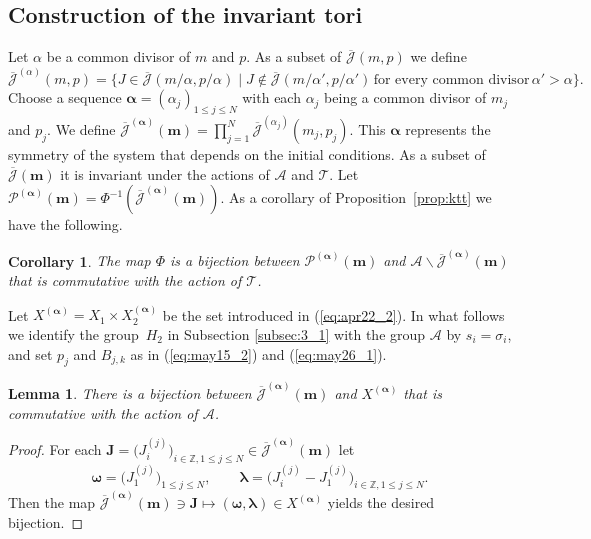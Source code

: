 \documentclass[11pt]{article}
\newtheorem{lemma}{Lemma}
\newtheorem{corollary}{Corollary}
\newcommand{\Z}{{\mathbb Z}}
\newcommand{\J}{{\mathcal J}}
\newcommand{\Jb}{{\overline{\mathcal J}}}
\newcommand\bom{\boldsymbol{\omega}}
\newcommand\bol{\boldsymbol{\lambda}}
\newcommand\boa{\boldsymbol{\alpha}}
\newcommand{\m}{{\boldsymbol m}}
\newcommand{\boJ}{{\boldsymbol J}}
\begin{document}
\subsection{Construction of the invariant tori}\label{subsec:4_4}
Let $\alpha$ be a common divisor of $m$ and $p$.
As a subset of $\Jb (m,p)$ %
we def\/ine
\begin{displaymath}
{\Jb}^{(\alpha)} (m,p) = \{
J \in {\Jb} (m/\alpha,p/\alpha) \mid
J \notin {\Jb} (m/\alpha',p/\alpha') \, \mbox{for every common divisor} \, \alpha' > \alpha \}.
\end{displaymath}
Choose a sequence $\boa = (\alpha_j)_{1 \leq j \leq N}$ with
each $\alpha_j$ being a common divisor of $m_j$ and $p_j$.
We def\/ine
$\Jb^{(\boa)} (\m) = \prod_{j=1}^N {\Jb}^{(\alpha_j)} (m_j,p_j)$.
%
This $\boa$ represents the symmetry of the system that depends on the initial conditions.
%
As a subset of $\Jb (\m)$ it is invariant under the actions of ${\mathcal A}$ and ${\mathcal T}$.
{Let
${\mathcal P}^{(\boa)}(\m) = \Phi^{-1}(\Jb^{(\boa)} (\m))$.}
As a corollary of Proposition~\ref{prop:ktt} we have the following.
\begin{corollary}\label{coro:ktt}
The map $\Phi$ is a bijection
between ${\mathcal P}^{(\boa)}(\m)$ and ${\mathcal A} \backslash
\Jb^{(\boa)} (\m)$
that is commutative with the action of ${\mathcal T}$.
\end{corollary}

Let $X^{(\boa)} = X_1 \times X_2^{(\boa)}$  be the set introduced in (\ref{eq:apr22_2}).
In what follows
we identify the group~$H_2$ in Subsection \ref{subsec:3_1} with the group ${\mathcal A}$ by $s_i = \sigma_i$,
and set $p_j$ and $B_{j,k}$ as in (\ref{eq:may15_2}) and (\ref{eq:may26_1}).

\begin{lemma}\label{lem:may14_1}
There is a bijection between $\Jb^{(\boa)} (\m)$ and $X^{(\boa)}$ that is commutative with the action of ${\mathcal A}$.
\end{lemma}

\begin{proof}
For each {$\boJ = \big(J^{(j)}_i\big)_{i \in \Z, 1 \leq j \leq N} \in \Jb^{(\boa)} (\m)$}
let
\begin{displaymath}
\bom = \big(J^{(j)}_1\big)_{1 \leq j \leq N}, \qquad \bol = \big(J^{(j)}_i-J^{(j)}_1\big)_{i \in \Z, 1 \leq j \leq N}.
\end{displaymath}
Then the map $\Jb^{(\boa)} (\m) \ni \boJ \mapsto (\bom, \bol) \in X^{(\boa)}$ yields the desired bijection.
\end{proof}
\end{document}
